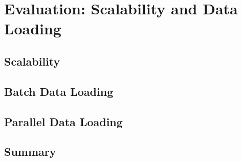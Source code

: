 {\chapter{Evaluation: Scalability and Data Loading}
\label{chap:Eval_5}

\section{Scalability}


\section{Batch Data Loading}


\section{Parallel Data Loading}


\section{Summary}
}